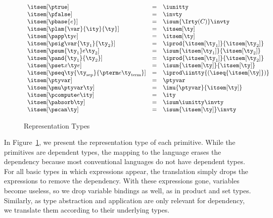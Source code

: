 \begin{figure}
\fbox{$\itsem[\ty] = \ity$}
\[
\begin{array}{lcl} 
\itsem[\ptrue] & = & \iunitty \\
\itsem[\pfalse] & = & \invty \\
\itsem[\pbase{e}] & = & \isum {\Irty(C)} \invty   \\
\itsem[\plam{\var}{\ity}{\ty}] & = & \itsem[\ty] \\
\itsem[\papp \ty e] & = & \itsem[\ty] \\
\itsem[\psig \var {\ty_1} {\ty_2}]  & = & \iprod {\itsem[\ty_1]} {\itsem[\ty_2]}    \\
\itsem[\psum {\ty_1} e {\ty_2}]     & = & \isum {\itsem[\ty_1]} {\itsem[\ty_2]} \\
\itsem[\pand {\ty_1} {\ty_2}]  & = & \iprod {\itsem[\ty_1]}{\itsem[\ty_2]}\\
\itsem[\pset x \ty e] & = & \isum {\itsem[\ty]}{\itsem[\ty]}\\
\itsem[\pseq \ty {\ty_{\text{sep}}} {\pterm e {\ty_{\text{term}}}}] & = & 
    \iprod \iintty {(\iseq{\itsem[\ty]})}             \\
\itsem[\ptyvar] & = & \ptyvar \\
\itsem[\pmu \ptyvar \ty] & = & \imu{\ptyvar}{\itsem[\ty]} \\
\itsem[\pcompute e \ity]                 & = & \ity \\
\itsem[\pabsorb \ty]                     & = & \isum \iunitty \invty \\
\itsem[\pscan \ty] & = & \isum {\itsem[\ty]} \invty 
\end{array}
\]
\caption{Representation Types}
\label{fig:rep-tys}
\end{figure}

In Figure~\ref{fig:rep-tys}, we present the representation type
of each \ddc{} primitive. While the primitives are
dependent types, the mapping to the \implang{} language erases the dependency because most conventional languages do not have dependent types. For all basic \ddc{} types in which expressions appear,
the translation simply drops the expressions to remove the dependency.
With these expressions gone, variables become useless, so we drop 
variable bindings as well, as in product and set types.
Similarly, as type abstraction and application are only relevant for
dependency, we translate them according to their underlying types.

